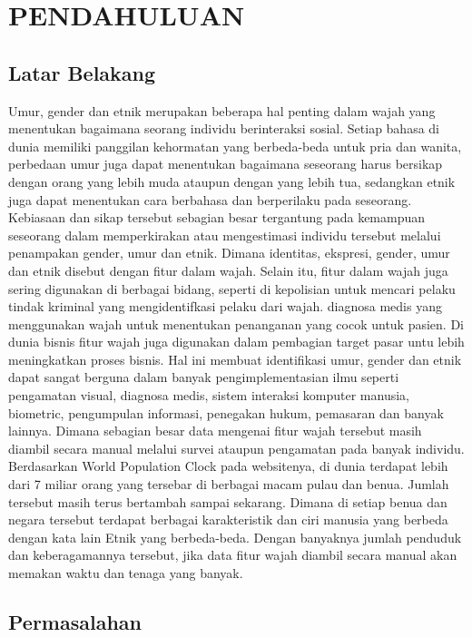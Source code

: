 \section{PENDAHULUAN}

\subsection{Latar Belakang}

Umur, gender dan etnik merupakan beberapa hal penting dalam wajah yang menentukan bagaimana seorang 
individu berinteraksi sosial. Setiap bahasa di dunia memiliki panggilan kehormatan yang berbeda-beda 
untuk pria dan wanita, perbedaan umur juga dapat menentukan bagaimana seseorang harus bersikap dengan 
orang yang lebih muda ataupun dengan yang lebih tua, sedangkan etnik juga dapat menentukan cara berbahasa 
dan berperilaku pada seseorang. Kebiasaan dan sikap tersebut sebagian besar tergantung pada kemampuan 
seseorang dalam memperkirakan atau mengestimasi individu tersebut melalui penampakan gender, umur dan 
etnik. Dimana identitas, ekspresi, gender, umur dan etnik disebut dengan fitur dalam wajah.
Selain itu, fitur dalam wajah juga sering digunakan di berbagai bidang, seperti di kepolisian untuk 
mencari pelaku tindak kriminal yang mengidentifkasi pelaku dari wajah. diagnosa medis yang menggunakan 
wajah untuk menentukan penanganan yang cocok untuk pasien. Di dunia bisnis fitur wajah juga digunakan 
dalam pembagian target pasar untu lebih meningkatkan proses bisnis.
Hal ini membuat identifikasi umur, gender dan etnik dapat sangat berguna dalam banyak pengimplementasian 
ilmu seperti pengamatan visual, diagnosa medis, sistem interaksi komputer manusia, biometric, pengumpulan 
informasi, penegakan hukum, pemasaran dan banyak lainnya. Dimana sebagian besar data mengenai fitur wajah 
tersebut masih diambil secara manual melalui survei ataupun pengamatan pada banyak individu.
Berdasarkan World Population Clock pada websitenya, di dunia terdapat lebih dari 7 miliar orang yang 
tersebar di berbagai macam pulau dan benua. Jumlah tersebut masih terus bertambah sampai sekarang. 
Dimana di setiap benua dan negara tersebut terdapat berbagai karakteristik dan ciri manusia yang berbeda 
dengan kata lain Etnik yang berbeda-beda. Dengan banyaknya jumlah penduduk dan keberagamannya tersebut, 
jika data fitur wajah diambil secara manual akan memakan waktu dan tenaga yang banyak.


\subsection{Permasalahan}

